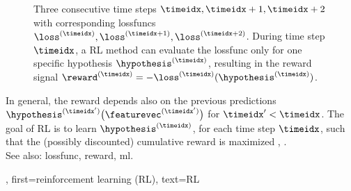 {{{{\begin{figure}
\begin{center}
		\caption{Three consecutive time steps $\timeidx,\timeidx+1,\timeidx+2$ with corresponding \glspl{lossfunc} $\loss^{(\timeidx)},
		\loss^{(\timeidx+1)}, \loss^{(\timeidx+2)}$. During time step $\timeidx$, a RL method can evaluate the 
		\gls{lossfunc} only for one specific \gls{hypothesis} $\hypothesis^{(\timeidx)}$, resulting in the \gls{reward} 
		signal $\reward^{(\timeidx)}=-\loss^{(\timeidx)}(\hypothesis^{(\timeidx)})$.}
			\end{center}
	\end{figure}
	In general, the \gls{reward} depends also on the 
	previous \glspl{prediction} $\hypothesis^{(\timeidx')}\big(\featurevec^{(\timeidx')}\big)$ 
	for $\timeidx' < \timeidx$. The goal of RL is to learn $\hypothesis^{(\timeidx)}$, for 
	each time step $\timeidx$, such that the (possibly discounted) cumulative \gls{reward} 
	is maximized \cite{MLBasics}, \cite{SuttonEd2}.
		\\
		See also: \gls{lossfunc}, \gls{reward}, \gls{ml}.},
	first={reinforcement learning (RL)},
	text={RL}
}

}}
